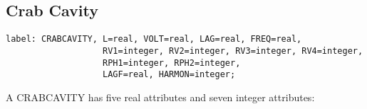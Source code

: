 
\subsection{Crab Cavity}


\begin{verbatim}
label: CRABCAVITY, L=real, VOLT=real, LAG=real, FREQ=real,
                   RV1=integer, RV2=integer, RV3=integer, RV4=integer, 
                   RPH1=integer, RPH2=integer, 
                   LAGF=real, HARMON=integer;                 
\end{verbatim} 


A CRABCAVITY has five real attributes and seven integer attributes: 

